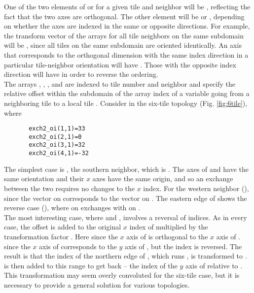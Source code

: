 One of the two elements of  or  for a
given tile  and neighbor  will be , reflecting
the fact that the two axes are orthogonal.  The other element will be
 or , depending on whether the axes are indexed in
the same or opposite directions.  For example, the transform vector of
the arrays for all tile neighbors on the same subdomain will be
, since all tiles on the same subdomain are oriented
identically.  An axis that corresponds to the orthogonal dimension
with the same index direction in a particular tile-neighbor
orientation will have .  Those with the opposite index
direction will have  in order to reverse the ordering. \\

The arrays ,
, , and
 are indexed to tile number and
neighbor and specify the relative offset within the subdomain of the
array index of a variable going from a neighboring tile  to a
local tile .  Consider  in the six-tile topology
(Fig. \ref{fig:6tile}), where

\begin{verbatim}
       exch2_oi(1,1)=33
       exch2_oi(2,1)=0
       exch2_oi(3,1)=32
       exch2_oi(4,1)=-32
\end{verbatim}

The simplest case is , the southern neighbor,
which is .  The axes of  and  have the
same orientation and their $x$ axes have the same origin, and so an
exchange between the two requires no changes to the $x$ index.  For
the western neighbor (),  since the
 vector on  corresponds to the  vector on
.  The eastern edge of  shows the reverse case
(), where  on  exchanges
with  on . \\

 The most interesting case, where  and
, involves a reversal of indices.  As in every case, the
offset  is added to the original $x$ index of 
multiplied by the transformation factor .  Here
 since the $x$ axis of  is orthogonal
to the $x$ axis of .   since the
$x$ axis of  corresponds to the $y$ axis of , but the
index is reversed.  The result is that the index of the northern edge
of , which runs , is transformed to
.  is then added to this range to
get back  -- the index of the $y$ axis of 
relative to .  This transformation may seem overly convoluted
for the six-tile case, but it is necessary to provide a general
solution for various topologies. \\




